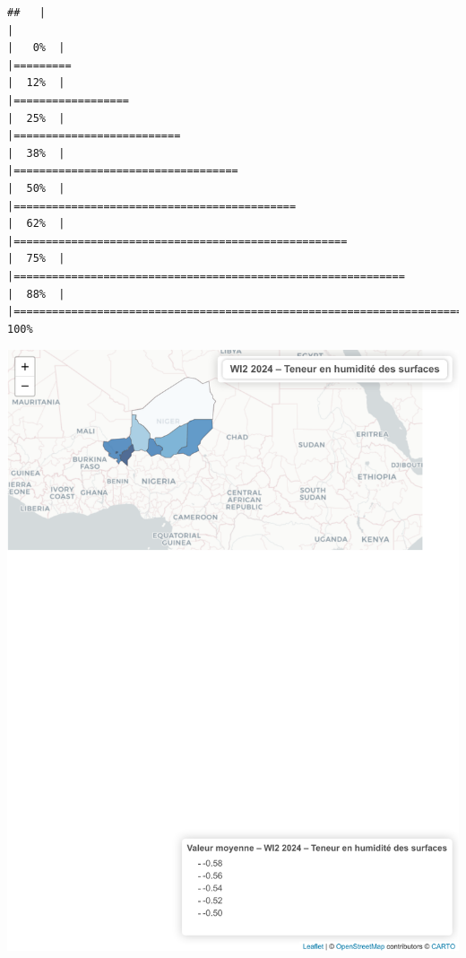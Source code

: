 \documentclass[
]{book}
\begin{document}
\begin{verbatim}
##   |                                                                              |                                                                      |   0%  |                                                                              |=========                                                             |  12%  |                                                                              |==================                                                    |  25%  |                                                                              |==========================                                            |  38%  |                                                                              |===================================                                   |  50%  |                                                                              |============================================                          |  62%  |                                                                              |====================================================                  |  75%  |                                                                              |=============================================================         |  88%  |                                                                              |======================================================================| 100%
\end{verbatim}

\includegraphics{Atlas-Spectral-Sahel_files/figure-latex/eau-wi2-1.pdf}
\end{document}
